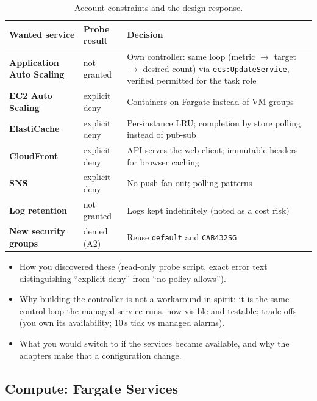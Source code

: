 \documentclass[a4paper,12pt]{article}
\begin{document}
\begin{table}[H]
\centering
\small
\begin{tabularx}{\linewidth}{>{\bfseries}p{3.6cm} >{\raggedright\arraybackslash}p{3.0cm} X}
\toprule
Wanted service & Probe result & Decision \\
\midrule
Application Auto Scaling & not granted & Own controller: same loop (metric $\rightarrow$ target $\rightarrow$ desired count) via \texttt{ecs:UpdateService}, verified permitted for the task role \\
EC2 Auto Scaling & explicit deny & Containers on Fargate instead of VM groups \\
ElastiCache & explicit deny & Per-instance LRU; completion by store polling instead of pub-sub \\
CloudFront & explicit deny & API serves the web client; immutable headers for browser caching \\
SNS & explicit deny & No push fan-out; polling patterns \\
Log retention & not granted & Logs kept indefinitely (noted as a cost risk) \\
New security groups & denied (A2) & Reuse \texttt{default} and \texttt{CAB432SG} \\
\bottomrule
\end{tabularx}
\caption{Account constraints and the design response.}
\label{tab:constraints}
\end{table}

\begin{yourwriting}
\begin{itemize}
    \item How you discovered these (read-only probe script, exact error text distinguishing ``explicit deny'' from ``no policy allows'').
    \item Why building the controller is not a workaround in spirit: it is the same control loop the managed service runs, now visible and testable; trade-offs (you own its availability; 10\,s tick vs managed alarms).
    \item What you would switch to if the services became available, and why the adapters make that a configuration change.
\end{itemize}
\end{yourwriting}

\subsection{Compute: Fargate Services}
\end{document}
